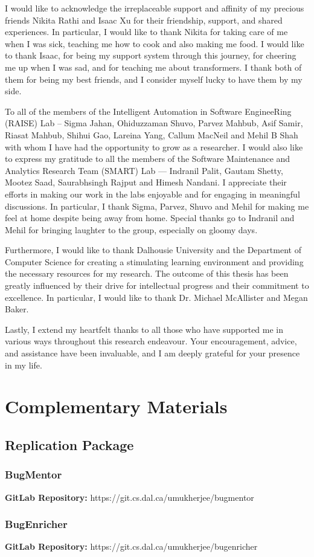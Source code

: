 \documentclass[12pt]{dalthesis}
\begin{document}
\begin{acknowledgements}
I would like to acknowledge the irreplaceable support and affinity of my precious friends Nikita Rathi and Isaac Xu for their friendship, support, and shared experiences. In particular, I would like to thank Nikita for taking care of me when I was sick, teaching me how to cook and also making me food. I would like to thank Isaac, for being my support system through this journey, for cheering me up when I was sad, and for teaching me about transformers. I thank both of them for being my best friends, and I consider myself lucky to have them by my side.

To all of the members of the Intelligent Automation in Software EngineeRing (RAISE) Lab -- Sigma Jahan, Ohiduzzaman Shuvo, Parvez Mahbub, Asif Samir, Riasat Mahbub, Shihui Gao, Lareina Yang, Callum MacNeil and Mehil B Shah with whom I have had the opportunity to grow as a researcher. I would also like to express my gratitude to all the members of the Software Maintenance and Analytics Research Team (SMART) Lab --- Indranil Palit, Gautam Shetty, Mootez Saad, Saurabhsingh Rajput and Himesh Nandani. I appreciate their efforts in making our work in the labs enjoyable and for engaging in meaningful discussions. In particular, I thank Sigma, Parvez, Shuvo and Mehil for making me feel at home despite being away from home. Special thanks go to Indranil and Mehil for bringing laughter to the group, especially on gloomy days.

Furthermore, I would like to thank Dalhousie University and the Department of Computer Science for creating a stimulating learning environment and providing the necessary resources for my research. The outcome of this thesis has been greatly influenced by their drive for intellectual progress and their commitment to excellence. In particular, I would like to thank Dr. Michael McAllister and Megan Baker.

Lastly, I extend my heartfelt thanks to all those who have supported me in various ways throughout this research endeavour. Your encouragement, advice, and assistance have been invaluable, and I am deeply grateful for your presence in my life.

\end{acknowledgements}

\mainmatter








\printbibliography

\appendix
\chapter{Complementary Materials}
\section{Replication Package}
\subsection{BugMentor}
\textbf{GitLab Repository:} https://git.cs.dal.ca/umukherjee/bugmentor

\subsection{BugEnricher}
\textbf{GitLab Repository:} https://git.cs.dal.ca/umukherjee/bugenricher
\end{document}
